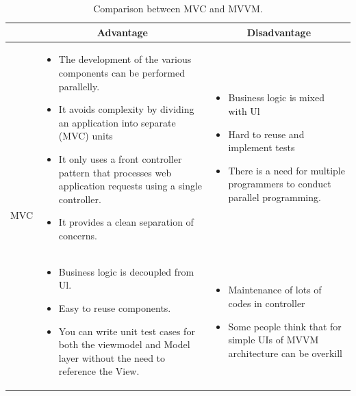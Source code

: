 \begin{table}[H]
    \centering
    \begin{tabular}{| c | p{} | p{} |}
        \hline
        \multicolumn{1}{|c|}{}
        & \multicolumn{1}{c|}{Advantage}
        & \multicolumn{1}{c|}{Disadvantage} \\ \hline
        \multirow{7}{*}{MVC}     
                &   \begin{itemize}[leftmargin=*,topsep=0pt,partopsep=0pt,parsep=0pt]
                        \item The development of the various components can be performed parallelly.
                        \item It avoids complexity by dividing an application into separate (MVC) units
                        \item It only uses a front controller pattern that processes web application requests using a single controller.
                        \item It provides a clean separation of concerns.
                    \end{itemize}
                &   \begin{itemize}[leftmargin=*,topsep=0pt,partopsep=0pt,parsep=0pt]
                        \item Business logic is mixed with Ul
                        \item Hard to reuse and implement tests
                        \item There is a need for multiple programmers to conduct parallel programming.
                    \end{itemize} \\ \hline
        \multirow{5}{*}{MVVC}
                &   \begin{itemize}[leftmargin=*,topsep=0pt,partopsep=0pt,parsep=0pt]
                        \item Business logic is decoupled from Ul.
                        \item Easy to reuse components.
                        \item You can write unit test cases for both the viewmodel and Model layer without the need to reference the View.
                    \end{itemize}
                &   \begin{itemize}[leftmargin=*,topsep=0pt,partopsep=0pt,parsep=0pt]
                        \item Maintenance of lots of codes in controller
                        \item Some people think that for simple UIs of MVVM architecture can be overkill
                    \end{itemize} \\ \hline
    \end{tabular}
    \caption{Comparison between MVC and MVVM.}
\end{table}

